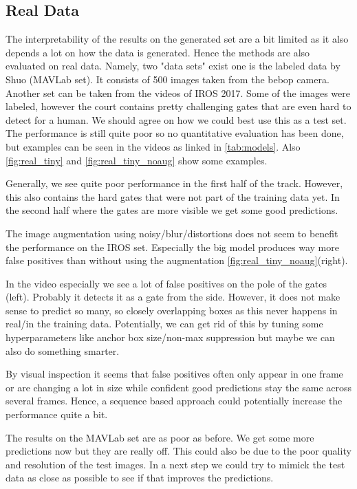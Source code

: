 \documentclass{article}
\begin{document}
\subsection{Real Data}

The interpretability of the results on the generated set are a bit limited as it also depends a lot on how the data is generated. Hence the methods are also evaluated on real data. Namely, two "data sets" exist one is the labeled data by Shuo (MAVLab set). It consists of 500 images taken from the bebop camera. Another set can be taken from the videos of IROS 2017. Some of the images were labeled, however the court contains pretty challenging gates that are even hard to detect for a human. We should agree on how we could best use this as a test set. The performance is still quite poor so no quantitative evaluation has been done, but examples can be seen in the videos as linked in \autoref{tab:models}. Also \autoref{fig:real_tiny} and \autoref{fig:real_tiny_noaug} show some examples.


Generally, we see quite poor performance in the first half of the track. However, this also contains the hard gates that were not part of the training data yet. In the second half where the gates are more visible we get some good predictions.

The image augmentation using noisy/blur/distortions does not seem to benefit the performance on the IROS set. Especially the big model produces way more false positives than without using the augmentation \autoref{fig:real_tiny_noaug}(right).

In the video especially we see a lot of false positives on the pole of the gates (left). Probably it detects it as a gate from the side. However, it does not make sense to predict so many, so closely overlapping boxes as this never happens in real/in the training data. Potentially, we can get rid of this by tuning some hyperparameters like anchor box size/non-max suppression but maybe we can also do something smarter.

By visual inspection it seems that false positives often only appear in one frame or are changing a lot in size while confident good predictions stay the same across several frames. Hence, a sequence based approach could potentially increase the performance quite a bit.

The results on the MAVLab set are as poor as before. We get some more predictions now but they are really off. This could also be due to the poor quality and resolution of the test images. In a next step we could try to mimick the test data as close as possible to see if that improves the predictions.
\end{document}
